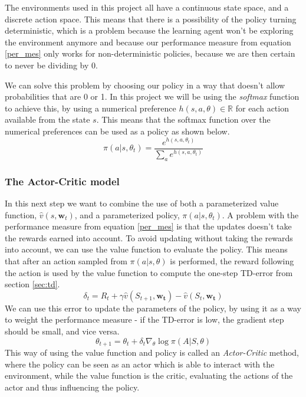 \documentclass[11pt]{article}
\begin{document}
The environments used in this project all have a continuous state space,
and a discrete action space.
This means that there is a possibility of the policy turning deterministic,
which is a problem because the learning agent won't be exploring the environment anymore
and because our performance measure from equation \ref{per_mes} only works for
non-deterministic policies, because we are then certain to never be dividing by 0.

We can solve this problem by choosing our policy in a way that doesn't allow probabilities that are 0 or 1.
In this project we will be using the \textit{softmax} function to achieve this,
by using a numerical preference $h(s, a, \theta) \in \mathbb{R}$
for each action available from the state $s$.
This means that the softmax function over the numerical preferences can be used as a policy
as shown below. 
\begin{equation}\label{eq:soft_max}
    \pi(a | s, \theta_t) = \frac{e^{h(s,a,\theta_t)}}{\sum\limits_{a} e^{h(s,a,\theta_t)}}
\end{equation}

\subsubsection{The Actor-Critic model}

In this next step we want to combine the use of both a parameterized value function, $\hat{v}(s, \mathbf{w}_t)$,
and a parameterized policy, $\pi(a|s, \theta_t)$.
A problem with the performance measure from equation \ref{per_mes} is that
the updates doesn't take the rewards earned into account. 
To avoid updating without taking the rewards into account, we can
use the value function to evaluate the policy.
This means that after an action sampled from $\pi(a|s,\theta)$ is performed,
the reward following the action is used by the value function to
compute the one-step TD-error from section \ref{sec:td}.
\begin{equation*}
    \delta_t =  R_t + \gamma \hat{v} (S_{t+1}, \mathbf{w_t}) - \hat{v}(S_t, \mathbf{w_t})
\end{equation*}
We can use this error to update the parameters of the policy,
by using it as a way to weight the performance measure - if the TD-error is low,
the gradient step should be small, and vice versa.
\begin{equation}
    \theta_{t+1} = \theta_t + \delta_t \nabla_{\theta} \log \pi(A | S, \theta)
\end{equation}
This way of using the value function and policy is called an
\textit{Actor-Critic} method, where the policy can be seen as an actor
which is able to interact with the environment, while the value function
is the critic, evaluating the actions of the actor and thus
influencing the policy.
\end{document}
